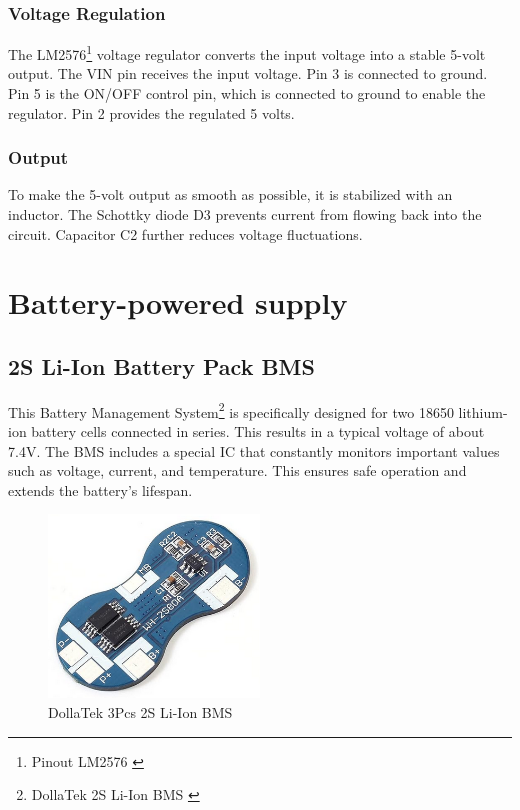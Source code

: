 \subsubsection{Voltage Regulation}
The LM2576\footnote{Pinout LM2576 \cite{pinout}} voltage regulator converts the input voltage into a stable 5-volt output. The VIN pin receives the input voltage. Pin 3 is connected to ground. Pin 5 is the ON/OFF control pin, which is connected to ground to enable the regulator. Pin 2 provides the regulated 5 volts.

\subsubsection{Output}
To make the 5-volt output as smooth as possible, it is stabilized with an inductor. The Schottky diode D3 prevents current from flowing back into the circuit. Capacitor C2 further reduces voltage fluctuations.

\newpage
\section{Battery-powered supply}

\subsection{2S Li-Ion Battery Pack BMS}

This Battery Management System\footnote{DollaTek 2S Li-Ion BMS \cite{bms}} is specifically designed for two 18650 lithium-ion battery cells connected in series. This results in a typical voltage of about 7.4V. The BMS includes a special IC that constantly monitors important values such as voltage, current, and temperature. This ensures safe operation and extends the battery's lifespan.

\begin{figure}[H]
  \centering
  \includegraphics[width=0.5\textwidth]{assets/BMS}
  \caption{DollaTek 3Pcs 2S Li-Ion BMS}
\end{figure}

